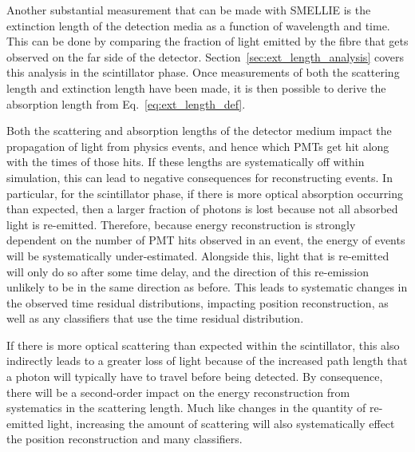 Another substantial measurement that can be made with SMELLIE is the extinction length of the detection media as a function of wavelength and time. This can be done by comparing the fraction of light emitted by the fibre that gets observed on the far side of the detector. Section~\ref{sec:ext_length_analysis} covers this analysis in the scintillator phase. Once measurements of both the scattering length and extinction length have been made, it is then possible to derive the absorption length from Eq.~\ref{eq:ext_length_def}.

Both the scattering and absorption lengths of the detector medium impact the propagation of light from physics events, and hence which PMTs get hit along with the times of those hits. If these lengths are systematically off within simulation, this can lead to negative consequences for reconstructing events. In particular, for the scintillator phase, if there is more optical absorption occurring than expected, then a larger fraction of photons is lost because not all absorbed light is re-emitted. Therefore, because energy reconstruction is strongly dependent on the number of PMT hits observed in an event, the energy of events will be systematically under-estimated. Alongside this, light that is re-emitted will only do so after some time delay, and the direction of this re-emission unlikely to be in the same direction as before. This leads to systematic changes in the observed time residual distributions, impacting position reconstruction, as well as any classifiers that use the time residual distribution.

If there is more optical scattering than expected within the scintillator, this also indirectly leads to a greater loss of light because of the increased path length that a photon will typically have to travel before being detected. By consequence, there will be a second-order impact on the energy reconstruction from systematics in the scattering length. Much like changes in the quantity of re-emitted light, increasing the amount of scattering will also systematically effect the position reconstruction and many classifiers.



